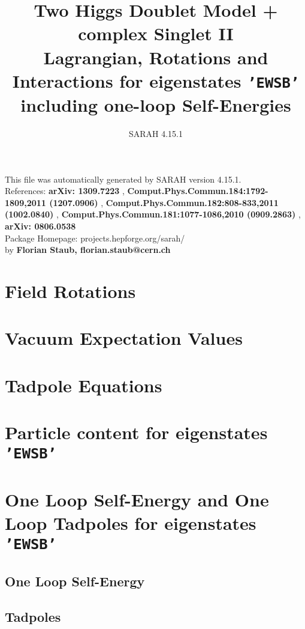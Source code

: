 \documentclass[A4]{article}
\begin{document}
\title{Two Higgs Doublet Model + complex Singlet II\\ Lagrangian, Rotations and Interactions for eigenstates {\tt'EWSB'} \\ including one-loop Self-Energies \\ 
} 
\author{SARAH 4.15.1} 
 \maketitle 
 \vspace{10cm} 
This file was automatically generated by SARAH version 4.15.1.  \\ 
References: {\bf arXiv: 1309.7223 }, {\bf Comput.Phys.Commun.184:1792-1809,2011 (1207.0906) }, {\bf Comput.Phys.Commun.182:808-833,2011 (1002.0840) }, {\bf Comput.Phys.Commun.181:1077-1086,2010 (0909.2863) }, {\bf arXiv: 0806.0538 } \\ 
Package Homepage: projects.hepforge.org/sarah/ \\ 
by {\bf Florian Staub, florian.staub@cern.ch} 
 \pagebreak 
 \tableofcontents 
 \pagebreak 
 \allowdisplaybreaks 

\section{Field Rotations}
 
 
 
\section{Vacuum Expectation Values}
 
\section{Tadpole Equations}
 
\section{Particle content for eigenstates {\tt 'EWSB'}}
 
\section{One Loop Self-Energy and One Loop Tadpoles for eigenstates {\tt 'EWSB'}}
\subsection{One Loop Self-Energy}
 
\subsection{Tadpoles}
 
\end{document}
